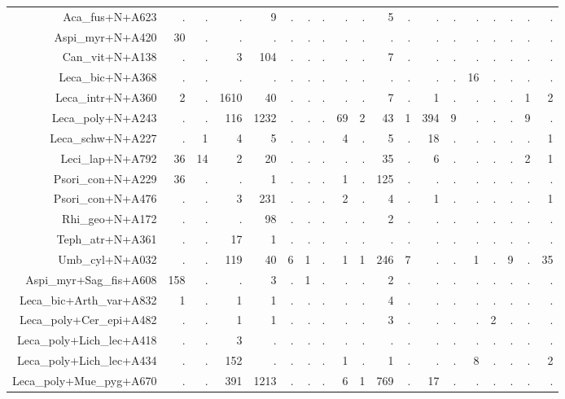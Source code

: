\documentclass[a4paper, 11]{article}\usepackage[]{graphicx}\usepackage[]{color}
\begin{document}
\begin{table}
\begin{tabular}{rrrrrrrrrrrrrrrrrrr}
  \hline
Aca\_fus+N+A623 & . & . & . & 9 & . & . & . & . & . & 5 & . & . & . & . & . & . & . & . \\ 
  Aspi\_myr+N+A420 & 30 & . & . & . & . & . & . & . & . & . & . & . & . & . & . & . & . & . \\ 
  Can\_vit+N+A138 & . & . & 3 & 104 & . & . & . & . & . & 7 & . & . & . & . & . & . & . & . \\ 
  Leca\_bic+N+A368 & . & . & . & . & . & . & . & . & . & . & . & . & . & 16 & . & . & . & . \\ 
  Leca\_intr+N+A360 & 2 & . & 1610 & 40 & . & . & . & . & . & 7 & . & 1 & . & . & . & . & 1 & 2 \\ 
  Leca\_poly+N+A243 & . & . & 116 & 1232 & . & . & . & 69 & 2 & 43 & 1 & 394 & 9 & . & . & . & 9 & . \\ 
  Leca\_schw+N+A227 & . & 1 & 4 & 5 & . & . & . & 4 & . & 5 & . & 18 & . & . & . & . & . & 1 \\ 
  Leci\_lap+N+A792 & 36 & 14 & 2 & 20 & . & . & . & . & . & 35 & . & 6 & . & . & . & . & 2 & 1 \\ 
  Psori\_con+N+A229 & 36 & . & . & 1 & . & . & . & 1 & . & 125 & . & . & . & . & . & . & . & . \\ 
  Psori\_con+N+A476 & . & . & 3 & 231 & . & . & . & 2 & . & 4 & . & 1 & . & . & . & . & . & 1 \\ 
  Rhi\_geo+N+A172 & . & . & . & 98 & . & . & . & . & . & 2 & . & . & . & . & . & . & . & . \\ 
  Teph\_atr+N+A361 & . & . & 17 & 1 & . & . & . & . & . & . & . & . & . & . & . & . & . & . \\ 
  Umb\_cyl+N+A032 & . & . & 119 & 40 & 6 & 1 & . & 1 & 1 & 246 & 7 & . & . & 1 & . & 9 & . & 35 \\ 
  Aspi\_myr+Sag\_fis+A608 & 158 & . & . & 3 & . & 1 & . & . & . & 2 & . & . & . & . & . & . & . & . \\ 
  Leca\_bic+Arth\_var+A832 & 1 & . & 1 & 1 & . & . & . & . & . & 4 & . & . & . & . & . & . & . & . \\ 
  Leca\_poly+Cer\_epi+A482 & . & . & 1 & 1 & . & . & . & . & . & 3 & . & . & . & . & 2 & . & . & . \\ 
  Leca\_poly+Lich\_lec+A418 & . & . & 3 & . & . & . & . & . & . & . & . & . & . & . & . & . & . & . \\ 
  Leca\_poly+Lich\_lec+A434 & . & . & 152 & . & . & . & . & 1 & . & 1 & . & . & . & 8 & . & . & . & 2 \\ 
  Leca\_poly+Mue\_pyg+A670 & . & . & 391 & 1213 & . & . & . & 6 & 1 & 769 & . & 17 & . & . & . & . & . & . \\ 

\end{tabular}
\end{table}
\end{document}
